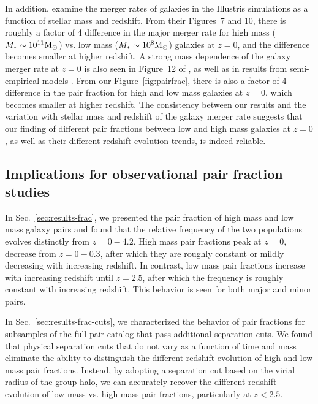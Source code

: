 \documentclass[twocolumn]{aastex631}
\begin{document}
        In addition, \cite{RG2015} examine the merger rates of galaxies in the Illustris simulations as a function of stellar mass and redshift.
        From their Figures~7 and 10, there is roughly a factor of 4 difference in the major merger rate for high mass ($M_* \sim 10^{11} \mathrm{M}_\odot$) vs. low mass ($M_* \sim 10^8 \mathrm{M}_\odot$) galaxies at $z=0$, and the difference becomes smaller at higher redshift. 
        A strong mass dependence of the galaxy merger rate at $z=0$ is also seen in Figure~12 of \cite{Guzman-Ortega2023}, as well as in results from semi-empirical models \citep{Stewart2009, Hopkins2010}.
        From our Figure~\ref{fig:pairfrac}, there is also a factor of 4 difference in the pair fraction for high and low mass galaxies at $z=0$, which becomes smaller at higher redshift.
        The consistency between our results and the variation with stellar mass and redshift of the galaxy merger rate suggests that our finding of different pair fractions between low and high mass galaxies at $z=0$, as well as their different redshift evolution trends, is indeed reliable.  

\subsection{Implications for observational pair fraction studies}\label{sec:disc-obs}

    In Sec.~\ref{sec:results-frac}, we presented the pair fraction of high mass and low mass galaxy pairs and found that the relative frequency of the two populations evolves distinctly from $z=0-4.2$. 
    High mass pair fractions peak at $z=0$, decrease from $z=0-0.3$, after which they are roughly constant or mildly decreasing with increasing redshift. 
    In contrast, low mass pair fractions increase with increasing redshift until $z=2.5$, after which the frequency is roughly constant with increasing redshift. 
    This behavior is seen for both major and minor pairs.  

    In Sec.~\ref{sec:results-frac-cuts}, we characterized the behavior of pair fractions for subsamples of the full pair catalog that pass additional separation cuts.
    We found that physical separation cuts that do not vary as a function of time and mass eliminate the ability to distinguish the different redshift evolution of high and low mass pair fractions. 
    Instead, by adopting a separation cut based on the virial radius of the group halo, we can accurately recover the different redshift evolution of low mass vs. high mass pair fractions, particularly at $z<2.5$.
\end{document}
